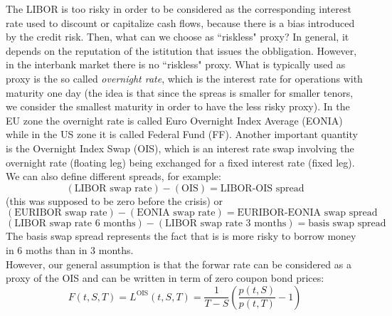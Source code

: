 The LIBOR is too risky in order to be considered as the corresponding interest rate used to discount or capitalize cash flows, because there is a bias introduced by the credit risk. Then, what can we choose as ``riskless" proxy? In general, it depends on the reputation of the istitution that issues the obbligation. However, in the interbank market there is no ``riskless" proxy. What is typically used as proxy is the so called \emph{overnight rate}, which is the interest rate for operations with maturity one day (the idea is that since the spreas is smaller for smaller tenors, we consider the smallest maturity in order to have the less risky proxy). In the EU zone the overnight rate is called Euro Overnight Index Average (EONIA) while in the US zone it is called Federal Fund (FF). Another important quantity is the Overnight Index Swap (OIS), which is an interest rate swap involving the overnight rate (floating leg) being exchanged for a fixed interest rate (fixed leg). \\ %
We can also define different spreads, for example:
\begin{equation*}
    (\text{LIBOR swap rate}) - (\text{OIS}) = \text{LIBOR-OIS spread}
\end{equation*}
(this was supposed to be zero before the crisis) or
\begin{equation*}
    (\text{EURIBOR swap rate}) - (\text{EONIA swap rate}) = \text{EURIBOR-EONIA swap spread}
\end{equation*}
\begin{equation*}
    (\text{LIBOR swap rate 6 months}) - (\text{LIBOR swap rate 3 months}) = \text{basis swap spread}
\end{equation*}
The basis swap spread represents the fact that is is more risky to borrow money in 6 moths than in 3 months.\\
However, our general assumption is that the forwar rate can be considered as a proxy of the OIS and can be written in term of zero coupon bond prices:
\begin{equation}
    F(t,S,T) = L^{\text{OIS}}(t,S,T) = \frac{1}{T-S}\left(\frac{p(t,S)}{p(t,T)}-1\right)
\end{equation}
